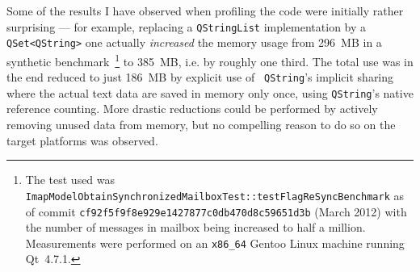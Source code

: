\documentclass[trojita]{subfiles}
\begin{document}
Some of the results I have observed when profiling the code were initially rather surprising --- for example, replacing
a {\tt QStringList} implementation by a {\tt QSet<QString>} one actually {\em increased} the memory usage from 296~MB in
a synthetic benchmark~\footnote{The test used was {\tt ImapModelObtainSynchronizedMailboxTest::testFlagReSyncBenchmark}
as of commit {\tt cf92f5f9f8e929e1427877c0db470d8c59651d3b} (March 2012) with the number of messages in mailbox being
increased to half a million.  Measurements were performed on an {\tt x86\_64} Gentoo Linux machine running Qt~4.7.1.} to
385~MB, i.e. by roughly one third.  The total use was in the end reduced to just 186~MB by explicit use of {\tt
QString}'s implicit sharing where the actual text data are saved in memory only once, using {\tt QString}'s native
reference counting.  More drastic reductions could be performed by actively removing unused data from memory, but no
compelling reason to do so on the target platforms was observed.
\end{document}
